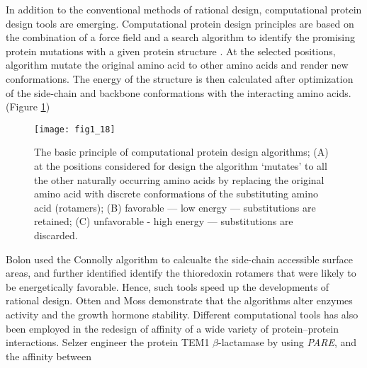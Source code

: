 \begin{refsection}
In addition to the conventional methods of rational design, computational
protein design tools are emerging. Computational protein design principles
are based on the combination of a force field and a search algorithm to
identify the promising protein mutations with a given protein structure
\cite{VanDerSloot2009a}. At the selected positions, algorithm mutate the
original amino acid to other amino acids and render new conformations. The
energy of the structure is then calculated after optimization of the side-chain
and backbone conformations with the interacting amino
acids\cite{VanDerSloot2009a}. (Figure \ref{fig:cpd})
\begin{figure}[h!] \centering \texttt{[image: fig1\_18]}
    \caption[The basic principle of computational protein design algorithms;
        (A) at the positions considered for design the algorithm ‘mutates’ to
        all the other naturally occurring amino acids by replacing the original
        amino acid with discrete conformations of the substituting amino acid
        (rotamers); (B) favorable — low energy — substitutions are retained;
        (C) unfavorable - high energy — substitutions are discarded.]{The basic
            principle of computational protein design algorithms; (A) at the
            positions considered for design the algorithm ‘mutates’ to all the
            other naturally occurring amino acids by replacing the original
            amino acid with discrete conformations of the substituting amino
            acid (rotamers); (B) favorable — low energy — substitutions are
            retained; (C) unfavorable - high energy — substitutions are
            discarded\cite{VanDerSloot2009a}.} 
    \label{fig:cpd} 
\end{figure}
Bolon  used the Connolly algorithm\cite{Connolly1983} to
calcualte the side-chain accessible surface areas, and further identified
identify the thioredoxin rotamers that were likely to be energetically
favorable\cite{Bolon2003}. Hence, such tools speed up the developments of
rational design. Otten  and Moss  demonstrate that
the algorithms alter enzymes activity \cite{Ottern2010} and the growth hormone
stability\cite{Moss2009}. Different computational tools has also been
employed in the redesign of affinity of a wide variety of protein–protein
interactions\cite{Selzer2000,Reina2002}. Selzer  engineer the
protein TEM1 $\beta$-lactamase by using \emph{PARE}, and the affinity between

\end{refsection}
